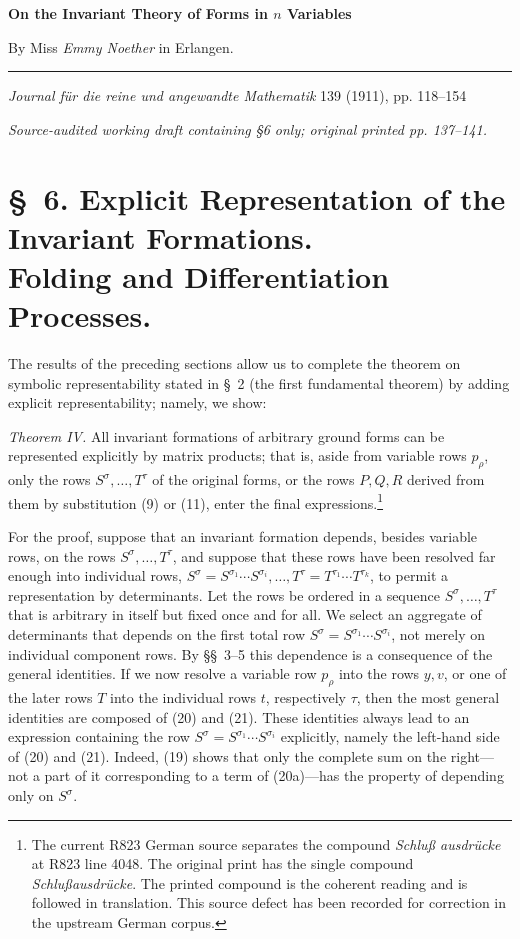 \documentclass[10pt]{article}
\begin{document}
\begin{center}
{\Large\bfseries On the Invariant Theory of Forms in $n$ Variables}\par
\vspace{0.5em}
By Miss \emph{Emmy Noether} in Erlangen.\par
\medskip
\rule{0.22\linewidth}{0.4pt}\par
\vspace{0.7em}
\emph{Journal f\"ur die reine und angewandte Mathematik} 139 (1911), pp. 118--154\par
\smallskip
{\small\itshape Source-audited working draft containing \S6 only; original printed pp. 137--141.}
\end{center}

\section*{\S\ 6. Explicit Representation of the Invariant Formations.\\Folding and Differentiation Processes.}

The results of the preceding sections allow us to complete the theorem on
symbolic representability stated in \S\ 2 (the first fundamental theorem) by
adding explicit representability; namely, we show:

\emph{Theorem IV.} All invariant formations of arbitrary ground forms can be
represented explicitly by matrix products; that is, aside from variable rows
$p_\rho$, only the rows $S^\sigma,\ldots,T^\tau$ of the original forms, or the
rows $P,Q,R$ derived from them by substitution (9) or (11), enter the final
expressions.\footnote{The current R823 German source separates the compound
\emph{Schlu\ss{} ausdr\"ucke} at R823 line 4048. The original print has the
single compound \emph{Schlu\ss ausdr\"ucke}. The printed compound is the
coherent reading and is followed in translation. This source defect has been
recorded for correction in the upstream German corpus.}

For the proof, suppose that an invariant formation depends, besides variable
rows, on the rows $S^\sigma,\ldots,T^\tau$, and suppose that these rows have
been resolved far enough into individual rows,
$S^\sigma=S^{\sigma_1}\cdots S^{\sigma_i},\ldots,
T^\tau=T^{\tau_1}\cdots T^{\tau_k}$, to permit a representation by
determinants. Let the rows be ordered in a sequence
$S^\sigma,\ldots,T^\tau$ that is arbitrary in itself but fixed once and for
all. We select an aggregate of determinants that depends on the first total
row $S^\sigma=S^{\sigma_1}\cdots S^{\sigma_i}$, not merely on individual
component rows. By \S\S\ 3--5 this dependence is a consequence of the general
identities. If we now resolve a variable row $p_\rho$ into the rows $y,v$, or
one of the later rows $T$ into the individual rows $t$, respectively $\tau$,
then the most general identities are composed of (20) and (21). These
identities always lead to an expression containing the row
$S^\sigma=S^{\sigma_1}\cdots S^{\sigma_i}$ explicitly, namely the left-hand
side of (20) and (21). Indeed, (19) shows that only the complete sum on the
right---not a part of it corresponding to a term of (20a)---has the property
of depending only on $S^\sigma$.
\end{document}
